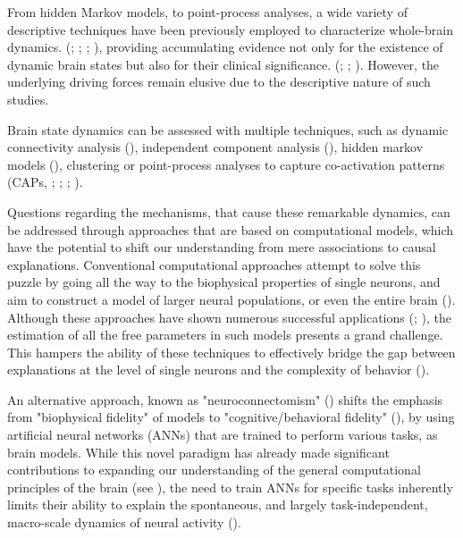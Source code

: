 \documentclass{article}
\begin{document}
From hidden Markov models, to point-process analyses, a wide variety of descriptive techniques have been previously
employed to characterize whole-brain dynamics. (\href{https://doi.org/10.1073/pnas.1121329109}{};
\href{https://doi.org/10.1073/pnas.1705120114}{}; \href{https://doi.org/10.1073/pnas.1216856110}{}; \href{https://doi.org/10.1089/brain.2018.0586}{}),
providing accumulating evidence not only for the existence of dynamic brain states but also for their clinical
significance. (\href{https://doi.org/10.1016/j.neuroimage.2013.05.079}{}; \cite{Barttfeld_2015};
\href{https://doi.org/10.1038/s41467-020-18717-w}{}).
However, the underlying driving forces remain elusive due to the descriptive nature of such studies.

Brain state dynamics can be assessed with multiple techniques, such as dynamic connectivity analysis (), independent
component analysis (\cite{Smith_2012}), hidden markov models
(\cite{Vidaurre_2017}), clustering \cite{Chen_2018} or point-process analyses to
capture co-activation patterns (CAPs, \href{https://doi.org/10.1073/pnas.1216856110}{};
\href{https://doi.org/10.1016/j.neuroimage.2015.01.057}{}; \cite{Liu_2013};
\href{https://doi.org/10.1038/s41467-020-18717-w}{}).

Questions regarding the mechanisms, that cause these remarkable dynamics, can be addressed through approaches that are
based on computational models, which have the potential to shift our understanding from mere associations to causal
explanations.
Conventional computational approaches attempt to solve this puzzle by going all the way to the biophysical properties
of single neurons, and aim to construct a model of larger neural populations, or even the entire brain
(\href{https://doi.org/10.1038/nn.4497}{}).
Although these approaches have shown numerous successful applications  (\cite{Kriegeskorte_2018};
\cite{Heinz_2018}), the estimation of all the free parameters in such models presents a grand
challenge.
This hampers the ability of these techniques to effectively bridge the gap between explanations at the level of single
neurons and the complexity of behavior (\cite{Breakspear_2017}).

An alternative approach, known as "neuroconnectomism" (\href{https://doi.org/10.1038/s41583-023-00705-w}{}) shifts the
emphasis from "biophysical fidelity" of models to "cognitive/behavioral fidelity"
(\cite{Kriegeskorte_2018}), by using artificial neural networks (ANNs) that are trained to
perform various tasks, as brain models.
While this novel paradigm has already made significant contributions to expanding our understanding of the general
computational principles of the brain (see \cite{Doerig_2023}), the need to train ANNs for
specific tasks inherently limits their ability to explain the spontaneous, and largely task-independent, macro-scale
dynamics of neural activity  (\cite{Richards_2019}).
\end{document}
